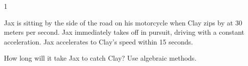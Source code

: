
\AddToShipoutPicture*{\BackgroundPic}

\addtocounter {ProbNum} {1}

 
{\bf \Large{}} Jax is sitting by the side of the road on his motorcycle when Clay zips by at 30 meters per second.  Jax immediately takes off in pursuit, driving with a constant acceleration.  Jax accelerates to Clay's speed within 15 seconds. \bigskip

How long will it take Jax to catch Clay?  Use algebraic methods. \paragraph{}
\noindent


\vfill
\newpage